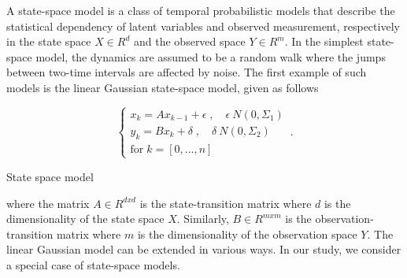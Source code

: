 \documentclass[mscthesis]{usiinfthesis}
\begin{document}
A state-space model is a class of temporal probabilistic models that describe the statistical dependency of latent variables and observed measurement, respectively in the state space $X \in R^d$ and the observed space $Y \in R^m$. In the simplest state-space model, the dynamics are assumed to be a random walk where the jumps between two-time intervals are affected by noise. The first example of such models is the linear Gaussian state-space model, given as follows

\begin{eqfloat}
\begin{equation}
    \begin{cases}
      x_k = A x_{k-1} + \epsilon \; , \quad \epsilon ~ N(0, \Sigma_1) \\
      y_k = B x_k + \delta  \; , \quad \delta ~ N(0, \Sigma_2)  \\
      \textrm{for} \; k = [0, ..., n]
    \end{cases}\,.
\label{eq:statespace}
\end{equation}
\caption{State space model}
\end{eqfloat}

where the matrix $A \in R^{dxd}$ is the state-transition matrix where $d$ is the dimensionality of the state space $X$. Similarly, $B \in R^{mxm}$ is the observation-transition matrix where $m$ is the dimensionality of the observation space $Y$. The linear Gaussian model can be extended in various ways. In our study, we consider a special case of state-space models.
\end{document}
